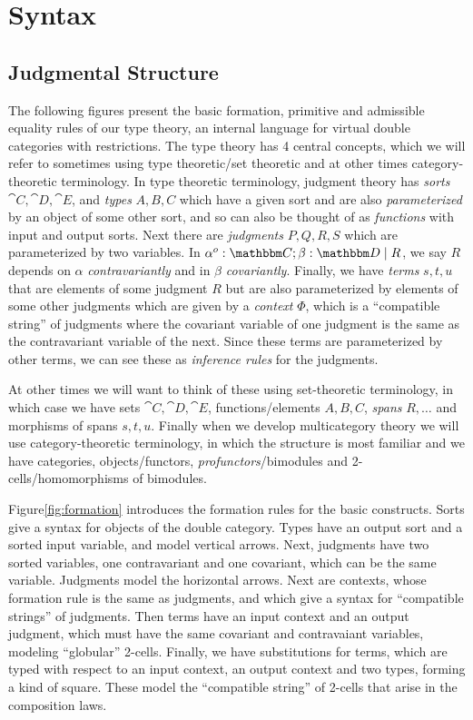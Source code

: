 \documentclass{article}
\begin{document}
\section{Syntax}

\subsection{Judgmental Structure}

The following figures present the basic formation, primitive and
admissible equality rules of our type theory, an internal language for
virtual double categories with restrictions.
%
The type theory has 4 central concepts, which we will refer to
sometimes using type theoretic/set theoretic and at other times
category-theoretic terminology.
%
In type theoretic terminology, judgment theory has \emph{sorts} $\cat
C, \cat D, \cat E$, and \emph{types} $A,B,C$ which have a given sort
and are also \emph{parameterized} by an object of some other sort, and
so can also be thought of as \emph{functions} with input and output
sorts.
%
Next there are \emph{judgments} $P,Q,R,S$ which are parameterized by
two variables.
%
In $\alpha^o:\cat C;\beta : \cat D \pipe R$, we say $R$ depends on
$\alpha$ \emph{contravariantly} and in $\beta$ \emph{covariantly}.
%
Finally, we have \emph{terms} $s,t,u$ that are elements of some
judgment $R$ but are also parameterized by elements of some other
judgments which are given by a \emph{context} $\Phi$, which is a
``compatible string'' of judgments where the covariant variable of one
judgment is the same as the contravariant variable of the next.
%
Since these terms are parameterized by other terms, we can see these
as \emph{inference rules} for the judgments.

At other times we will want to think of these using set-theoretic
terminology, in which case we have sets $\cat C,\cat D, \cat E$,
functions/elements $A,B,C$, \emph{spans} $R,\ldots$ and morphisms of
spans $s,t,u$.
%
Finally when we develop multicategory theory we will use
category-theoretic terminology, in which the structure is most
familiar and we have categories, objects/functors,
\emph{profunctors}/bimodules and 2-cells/homomorphisms of bimodules.

Figure\ref{fig:formation} introduces the formation rules for the basic
constructs. Sorts give a syntax for objects of the double
category. Types have an output sort and a sorted input variable, and
model vertical arrows. Next, judgments have two sorted variables, one
contravariant and one covariant, which can be the same
variable. Judgments model the horizontal arrows. Next are contexts,
whose formation rule is the same as judgments, and which give a syntax
for ``compatible strings'' of judgments. Then terms have an input
context and an output judgment, which must have the same covariant and
contravaiant variables, modeling ``globular'' 2-cells. Finally, we
have substitutions for terms, which are typed with respect to an input
context, an output context and two types, forming a kind of
square. These model the ``compatible string'' of 2-cells that arise in
the composition laws.
\end{document}
